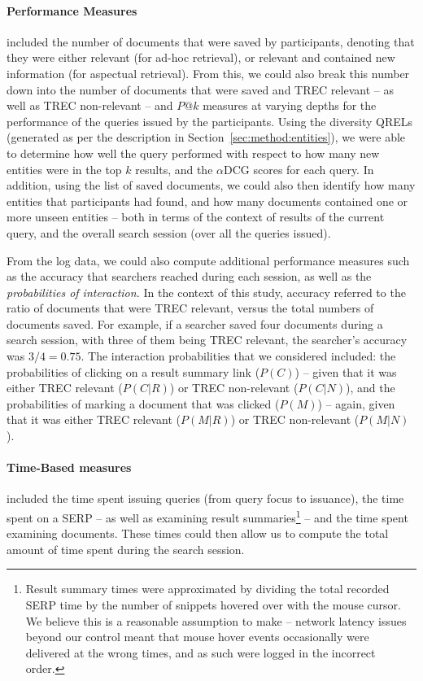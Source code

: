 \paragraph{Performance Measures} included the number of documents that were saved by participants, denoting that they were either relevant (for ad-hoc retrieval), or relevant and contained new information (for aspectual retrieval). From this, we could also break this number down into the number of documents that were saved and TREC relevant -- as well as TREC non-relevant -- and $P@k$ measures at varying depths for the performance of the queries issued by the participants. Using the diversity QRELs (generated as per the description in Section~\ref{sec:method:entities}), we were able to determine how well the query performed with respect to how many new entities were in the top $k$ results, and the $\alpha$DCG scores for each query. In addition, using the list of saved documents, we could also then identify how many entities that participants had found, and how many documents contained one or more unseen entities -- both in terms of the context of results of the current query, and the overall search session (over all the queries issued).

From the log data, we could also compute additional performance measures such as the accuracy that searchers reached during each session, as well as the \emph{probabilities of interaction.} In the context of this study, accuracy referred to the ratio of documents that were TREC relevant, versus the total numbers of documents saved. For example, if a searcher saved four documents during a search session, with three of them being TREC relevant, the searcher's accuracy was $3/4 = 0.75$. The interaction probabilities that we considered included: the probabilities of clicking on a result summary link ($P(C)$) -- given that it was either TREC relevant ($P(C|R)$) or TREC non-relevant ($P(C|N)$), and the probabilities of marking a document that was clicked ($P(M)$) -- again, given that it was either TREC relevant ($P(M|R)$) or TREC non-relevant ($P(M|N)$).

\paragraph{Time-Based measures} included the time spent issuing queries (from query focus to issuance), the time spent on a SERP -- as well as examining result summaries\footnote{Result summary times were approximated by dividing the total recorded SERP time by the number of snippets hovered over with the mouse cursor. We believe this is a reasonable assumption to make -- network latency issues beyond our control meant that mouse hover events occasionally were delivered at the wrong times, and as such were logged in the incorrect order.} -- and the time spent examining documents. These times could then allow us to compute the total amount of time spent during the search session.

